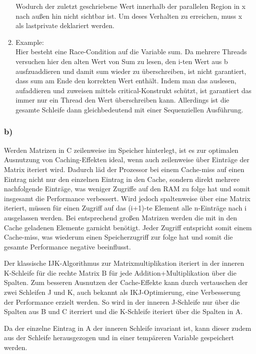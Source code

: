\documentclass{article}
\begin{document}
\begin{enumerate}
				Wodurch der zuletzt geschriebene Wert innerhalb der parallelen Region in x nach außen hin nicht sichtbar ist.
				Um deses Verhalten zu erreichen, muss x als lastprivate deklariert werden.
			\item Example: \\
				Hier besteht eine Race-Condition auf die Variable sum. 
				Da mehrere Threads versuchen hier den alten Wert von Sum zu lesen, den i-ten Wert aus b ausfzuaddieren und damit sum wieder zu überschreiben, ist nicht garantiert, dass sum am Ende den korrekten Wert enthält.
				Indem man das auslesen, aufaddieren und zuweisen mittels critical-Konstrukt schützt, ist garantiert das immer nur ein Thread den Wert überschreiben kann.
				Allerdings ist die gesamte Schleife dann gleichbedeutend mit einer Sequenziellen Ausführung.
		\end{enumerate}

		\subsubsection{b)}
			Werden Matrizen in C zeilenweise im Speicher hinterlegt, ist es zur optimalen Ausnutzung von Caching-Effekten ideal, wenn auch zeilenweise über Einträge der Matrix iteriert wird.
			Dadurch läd der Prozessor bei einem Cache-miss auf einen Eintrag nicht nur den einzelnen Eintrag in den Cache, sondern direkt mehrere nachfolgende Einträge, was weniger Zugriffe auf den RAM zu folge hat und somit insgesamt die Performance verbessert.
			Wird jedoch spaltenweise über eine Matrix iteriert, müssen für einen Zugriff auf das (i+1)-te Element alle n-Einträge nach i ausgelassen werden. 
			Bei entsprechend großen Matrizen werden die mit in den Cache geladenen Elemente garnicht benötigt.
			Jeder Zugriff entspricht somit einem Cache-miss, was wiederum einen Speicherzugriff zur folge hat und somit die gesamte Performance negative beeinflusst.
			
			Der klassische IJK-Algorithmus zur Matrixmultiplikation iteriert in der inneren K-Schleife für die rechte Matrix B für jede Addition+Multiplikation über die Spalten.
			Zum besseren Ausnutzen der Cache-Effekte kann durch vertauschen der zwei Schleifen J und K, auch bekannt als IKJ-Optimierung, eine Verbesserung der Performance erzielt werden.
			So wird in der inneren J-Schleife nur über die Spalten aus B und C iterriert und die K-Schleife iteriert über die Spalten in A.

			Da der einzelne Eintrag in A der inneren Schleife invariant ist, kann dieser zudem aus der Schleife herausgezogen und in einer tempäreren Variable gespeichert werden.
\end{document}
